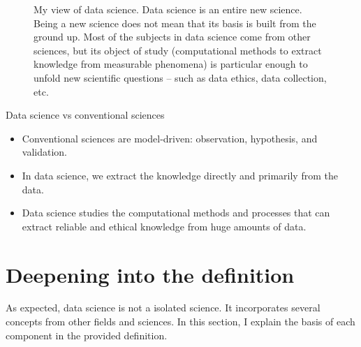 \def\verrids{(0,0) circle (20mm)}
\def\verrist{(-2.5,0) circle (15mm)}
\def\verride {(2.5,0) circle (15mm)}
\def\verrics {(0,-2.5) circle (15mm)}

\begin{figure}
  \centering
  \caption{
    My view of data science.  Data science is an entire new science.  Being a new science
    does not mean that its basis is built from the ground up.  Most of the subjects in
    data science come from other sciences, but its object of study (computational methods
    to extract knowledge from measurable phenomena) is particular enough to unfold
    new scientific questions -- such as data ethics, data collection, etc.
  }
\end{figure}

\begin{mainbox}{Data science vs conventional sciences}
  \begin{itemize}
    \item Conventional sciences are model-driven: observation, hypothesis, and validation.
    \item In data science, we extract the knowledge directly and primarily from the data.
    \item Data science studies the computational methods and processes that can extract
      reliable and ethical knowledge from huge amounts of data.
  \end{itemize}
\end{mainbox}

\section{Deepening into the definition}

As expected, data science is not a isolated science.  It incorporates several concepts
from other fields and sciences.  In this section, I explain the basis of each component in
the provided definition.

